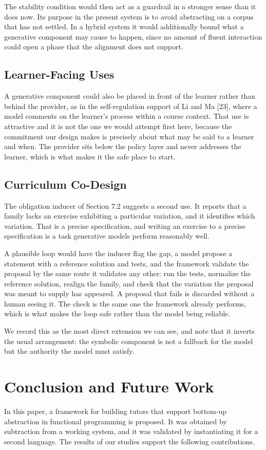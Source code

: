 \documentclass[10pt,twocolumn,letterpaper]{article}
\begin{document}
The stability condition would then act as a guardrail in a stronger sense than it does now. Its purpose in the present system is to avoid abstracting on a corpus that has not settled. In a hybrid system it would additionally bound what a generative component may cause to happen, since no amount of fluent interaction could open a phase that the alignment does not support.

\subsection{Learner-Facing Uses}
A generative component could also be placed in front of the learner rather than
behind the provider, as in the self-regulation support of Li and Ma [23], where a
model comments on the learner's process within a course context. That use is
attractive and it is not the one we would attempt first here, because the
commitment our design makes is precisely about what may be said to a learner and
when. The provider sits below the policy layer and never addresses the learner,
which is what makes it the safe place to start.

\subsection{Curriculum Co-Design}
The obligation inducer of Section 7.2 suggests a second use. It reports that a family lacks an exercise exhibiting a particular variation, and it identifies which variation. That is a precise specification, and writing an exercise to a precise specification is a task generative models perform reasonably well.

A plausible loop would have the inducer flag the gap, a model propose a statement with a reference solution and tests, and the framework validate the proposal by the same route it validates any other: run the tests, normalize the reference solution, realign the family, and check that the variation the proposal was meant to supply has appeared. A proposal that fails is discarded without a human seeing it. The check is the same one the framework already performs, which is what makes the loop safe rather than the model being reliable.

We record this as the most direct extension we can see, and note that it inverts the usual arrangement: the symbolic component is not a fallback for the model but the authority the model must satisfy.

\section{Conclusion and Future Work}
In this paper, a framework for building tutors that support bottom-up
abstraction in functional programming is proposed. It was obtained by
subtraction from a working system, and it was validated by instantiating
it for a second language. The results of our studies support the
following contributions.
\end{document}
